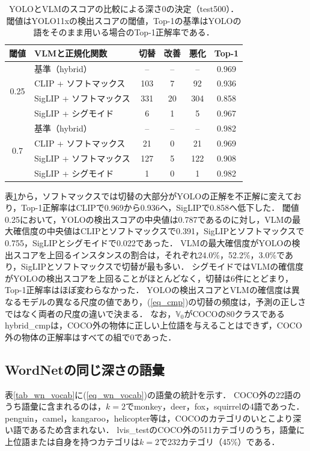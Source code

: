 \begin{table}[t]
    \centering
    \caption{YOLOとVLMのスコアの比較による深さ0の決定（test500）．閾値はYOLO11xの検出スコアの閾値，Top-1の基準はYOLOの語をそのまま用いる場合のTop-1正解率である．}
    \label{tab_cmp}
    \small
    \setlength{\tabcolsep}{2.5pt}
    \begin{tabular}{clcccc}
        \toprule
        閾値 & VLMと正規化関数 & 切替 & 改善 & 悪化 & Top-1 \\
        \midrule
        \multirow{4}{*}{0.25} & 基準（hybrid） & -- & -- & -- & 0.969 \\
        & CLIP + ソフトマックス & 103 & 7 & 92 & 0.936 \\
        & SigLIP + ソフトマックス & 331 & 20 & 304 & 0.858 \\
        & SigLIP + シグモイド & 6 & 1 & 5 & 0.967 \\
        \midrule
        \multirow{4}{*}{0.7} & 基準（hybrid） & -- & -- & -- & 0.982 \\
        & CLIP + ソフトマックス & 21 & 0 & 21 & 0.969 \\
        & SigLIP + ソフトマックス & 127 & 5 & 122 & 0.908 \\
        & SigLIP + シグモイド & 1 & 0 & 1 & 0.982 \\
        \bottomrule
    \end{tabular}
\end{table}

表\ref{tab_cmp}から，ソフトマックスでは切替の大部分がYOLOの正解を不正解に変えており，Top-1正解率はCLIPで0.969から0.936へ，SigLIPで0.858へ低下した．
閾値0.25において，YOLOの検出スコアの中央値は0.787であるのに対し，VLMの最大確信度の中央値はCLIPとソフトマックスで0.391，SigLIPとソフトマックスで0.755，SigLIPとシグモイドで0.022であった．
VLMの最大確信度がYOLOの検出スコアを上回るインスタンスの割合は，それぞれ24.0\%，52.2\%，3.0\%であり，SigLIPとソフトマックスで切替が最も多い．
シグモイドではVLMの確信度がYOLOの検出スコアを上回ることがほとんどなく，切替は6件にとどまり，Top-1正解率はほぼ変わらなかった．
YOLOの検出スコアとVLMの確信度は異なるモデルの異なる尺度の値であり，(\ref{eq_cmp})の切替の頻度は，予測の正しさではなく両者の尺度の違いで決まる．
なお，$ {\mathbb V}_0 $がCOCOの80クラスであるhybrid\_cmpは，COCO外の物体に正しい上位語を与えることはできず，COCO外の物体の正解率はすべての組で0であった．

\subsection{WordNetの同じ深さの語彙}
表\ref{tab_wn_vocab}に(\ref{eq_wn_vocab})の語彙の統計を示す．
COCO外の22語のうち語彙に含まれるのは，$ k = 2 $でmonkey，deer，fox，squirrelの4語であった．
penguin，camel，kangaroo，helicopter等は，COCOのカテゴリのいとこより深い語であるため含まれない．
lvis\_testのCOCO外の511カテゴリのうち，語彙に上位語または自身を持つカテゴリは$ k = 2 $で232カテゴリ（45\%）である．


